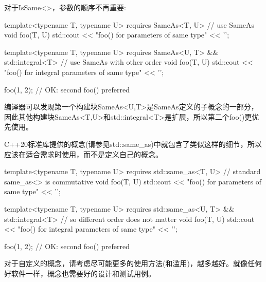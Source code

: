 对于IsSame<>，参数的顺序不再重要:

\begin{cpp}
template<typename T, typename U>
requires SameAs<T, U> // use SameAs
void foo(T, U)
{
	std::cout << "foo() for parameters of same type" << '\n';
}

template<typename T, typename U>
requires SameAs<U, T> && std::integral<T> // use SameAs with other order
void foo(T, U)
{
	std::cout << "foo() for integral parameters of same type" << '\n';
}

foo(1, 2); // OK: second foo() preferred
\end{cpp}

编译器可以发现第一个构建块SameAs<U,T>是SameAs定义的子概念的一部分，因此其他构建块SameAs<T,U>和std::integral<T>是扩展，所以第二个foo()更优先使用。

C++20标准库提供的概念(请参见std::same\_as)中就包含了类似这样的细节，所以应该在适合需求时使用，而不是定义自己的概念。

\begin{cpp}
template<typename T, typename U>
requires std::same_as<T, U> // standard same_as<> is commutative
void foo(T, U)
{
	std::cout << "foo() for parameters of same type" << '\n';
}

template<typename T, typename U>
requires std::same_as<U, T> && std::integral<T> // so different order does not matter
void foo(T, U)
{
	std::cout << "foo() for integral parameters of same type" << '\n';
}

foo(1, 2); // OK: second foo() preferred
\end{cpp}

对于自定义的概念，请考虑尽可能更多的使用方法(和滥用)，越多越好。就像任何好软件一样，概念也需要好的设计和测试用例。












